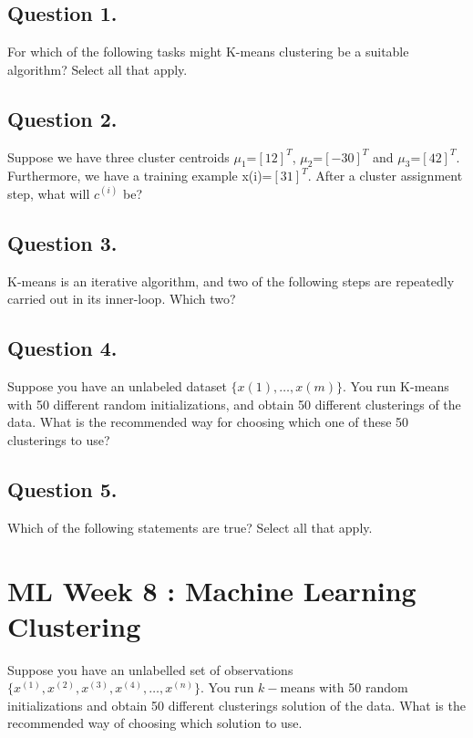 \subsection*{Question 1. }
For which of the following tasks might K-means clustering be a suitable algorithm? Select all that apply.


\subsection*{Question 2.} 
Suppose we have three cluster centroids $\mu_1$=$[1 2]^T$, $\mu_2$=$[−3 0]^T$ and $\mu_3$=$[4 2]^T$. 
Furthermore, we have a training example x(i)=$[3 1]^T$. After a cluster assignment step, what will $c^{(i)}$ be?


\subsection*{Question 3.}
K-means is an iterative algorithm, and two of the following steps are repeatedly carried out in its inner-loop. Which two?


\subsection*{Question 4. }
Suppose you have an unlabeled dataset $\{x(1),\ldots,x(m)\}$. You run K-means with 50 different random
initializations, and obtain 50 different clusterings of the data. 
What is the recommended way for choosing which one of these 50 clusterings to use?

\subsection*{Question 5. }
Which of the following statements are true? Select all that apply.


\newpage
\section{ML Week 8 : Machine Learning Clustering}

Suppose you have an unlabelled set of observations$\{ x^{(1)},x^{(2)},x^{(3)},x^{(4)}, \ldots ,x^{(n)}\}$.
You run $k-$means with 50 random initializations and obtain 50 different clusterings solution of the data.
What is the recommended way of choosing which solution to use.

